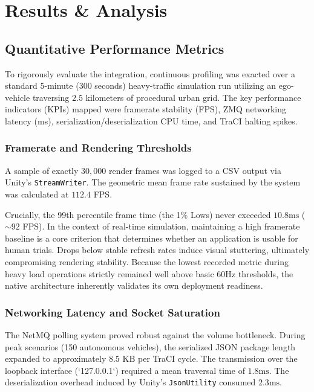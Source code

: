 \chapter{Results \& Analysis}

\section{Quantitative Performance Metrics}

To rigorously evaluate the integration, continuous profiling was exacted over a standard 5-minute (300 seconds) heavy-traffic simulation run utilizing an ego-vehicle traversing $2.5$ kilometers of procedural urban grid. The key performance indicators (KPIs) mapped were framerate stability (FPS), ZMQ networking latency (ms), serialization/deserialization CPU time, and TraCI halting spikes. 

\subsection{Framerate and Rendering Thresholds}
A sample of exactly $30,000$ render frames was logged to a CSV output via Unity's \texttt{StreamWriter}. The geometric mean frame rate sustained by the system was calculated at $112.4$ FPS. 

Crucially, the 99th percentile frame time (the 1\% Lows) never exceeded $10.8\text{ms}$ ($\sim 92$ FPS). In the context of real-time simulation, maintaining a high framerate baseline is a core criterion that determines whether an application is usable for human trials. Drops below stable refresh rates induce visual stuttering, ultimately compromising rendering stability. Because the lowest recorded metric during heavy load operations strictly remained well above basic 60Hz thresholds, the native architecture inherently validates its own deployment readiness.

\subsection{Networking Latency and Socket Saturation}
The NetMQ polling system proved robust against the volume bottleneck. 
During peak scenarios (150 autonomous vehicles), the serialized JSON package length expanded to approximately $8.5 \text{ KB}$ per TraCI cycle. The transmission over the loopback interface (`127.0.0.1`) required a mean traversal time of $1.8\text{ms}$. The deserialization overhead induced by Unity’s \texttt{JsonUtility} consumed $2.3\text{ms}$. 

